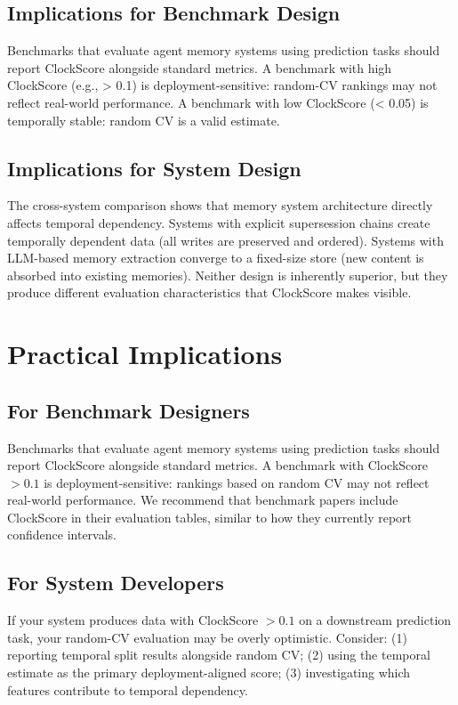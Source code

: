\documentclass[sigconf,nonacm]{acmart}
\begin{document}
\subsection{Implications for Benchmark Design}
Benchmarks that evaluate agent memory systems using prediction tasks should report ClockScore alongside standard metrics. A benchmark with high ClockScore (e.g., > 0.1) is deployment-sensitive: random-CV rankings may not reflect real-world performance. A benchmark with low ClockScore (< 0.05) is temporally stable: random CV is a valid estimate.

\subsection{Implications for System Design}
The cross-system comparison shows that memory system architecture directly affects temporal dependency. Systems with explicit supersession chains create temporally dependent data (all writes are preserved and ordered). Systems with LLM-based memory extraction converge to a fixed-size store (new content is absorbed into existing memories). Neither design is inherently superior, but they produce different evaluation characteristics that ClockScore makes visible.

\section{Practical Implications}

\subsection{For Benchmark Designers}
Benchmarks that evaluate agent memory systems using prediction tasks should report ClockScore alongside standard metrics. A benchmark with ClockScore $> 0.1$ is deployment-sensitive: rankings based on random CV may not reflect real-world performance. We recommend that benchmark papers include ClockScore in their evaluation tables, similar to how they currently report confidence intervals.

\subsection{For System Developers}
If your system produces data with ClockScore $> 0.1$ on a downstream prediction task, your random-CV evaluation may be overly optimistic. Consider: (1) reporting temporal split results alongside random CV; (2) using the temporal estimate as the primary deployment-aligned score; (3) investigating which features contribute to temporal dependency.
\end{document}

